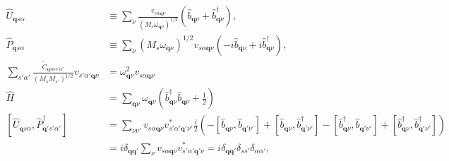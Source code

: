 \documentclass{article}
\begin{document}
\begin{align}
    \hat{U}_{\textbf{q}s\alpha} &\equiv \sum_{\nu} \frac{v_{s\alpha \textbf{q}\nu}}{(M_s \omega_{\textbf{q}\nu})^{1/2}} 
    (\hat{b}_{\textbf{q}\nu} + \hat{b}_{\textbf{q}\nu}^\dagger),
    \\
    \hat{P}_{\textbf{q}s\alpha} &\equiv \sum_{\nu} (M_s \omega_{\textbf{q}\nu})^{1/2} v_{s\alpha \textbf{q}\nu}
    (-i \hat{b}_{\textbf{q}\nu} + i \hat{b}_{\textbf{q}\nu}^\dagger),
    \\
    \sum_{s'\alpha'} \frac{\tilde{C}_{\textbf{q}s\alpha s'\alpha'}}{(M_s M_{s'})^{1/2}} v_{s'\alpha' \textbf{q}\nu} 
    &= \omega_{\textbf{q}\nu}^2 v_{s\alpha \textbf{q}\nu}
    \label{eigen}
    \\
    \hat{H} &=\sum_{{\textbf{q}\nu}} \omega_{\textbf{q}\nu} \left(\hat{b}_{\textbf{q}\nu}^\dagger\hat{b}_{\textbf{q}\nu} + \frac{1}{2}\right)
    \\
    [\hat{U}_{\textbf{q}s\alpha}, \hat{P}_{\textbf{q}'s'\alpha'}^\dagger] 
    &= \sum_{\nu \nu'} v_{s \alpha \textbf{q} \nu} v_{s' \alpha' \textbf{q}' \nu'}^*
    \frac{i}{2}(-[\hat{b}_{\textbf{q} \nu}, \hat{b}_{\textbf{q}' \nu'}] + [\hat{b}_{\textbf{q} \nu}, \hat{b}_{\textbf{q}' \nu'}^\dagger]
    -[\hat{b}_{\textbf{q} \nu}^\dagger, \hat{b}_{\textbf{q}' \nu'}] + [\hat{b}_{\textbf{q} \nu}^\dagger, \hat{b}_{\textbf{q}' \nu'}^\dagger])
    \nonumber \\
    &= i \delta_{\textbf{q}\textbf{q}'} \sum_\nu v_{s \alpha \textbf{q} \nu} v_{s' \alpha' \textbf{q}' \nu}^* 
    = i \delta_{\textbf{q}\textbf{q}'} \delta_{s s'}\delta_{\alpha \alpha'},
\end{align}
\end{document}
